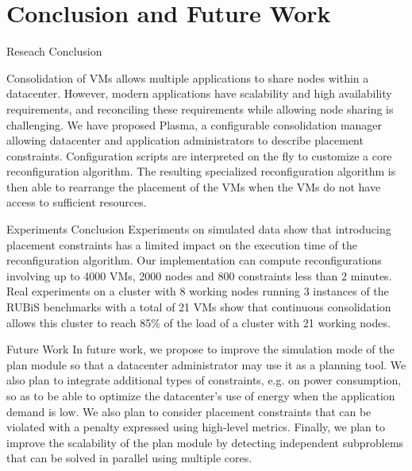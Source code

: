 \section{Conclusion and Future Work} 
\begin{frame}{Reseach Conclusion}

Consolidation of VMs allows multiple applications to share nodes within a 
datacenter. However, modern applications have scalability and high availability
requirements, and reconciling these requirements while allowing node sharing is
challenging. We have proposed Plasma, a configurable consolidation manager
allowing datacenter and application administrators to describe placement 
constraints. Configuration scripts are interpreted on the fly to customize a core
reconfiguration algorithm. The resulting specialized reconfiguration algorithm
is then able to rearrange the placement of the VMs when the VMs do not have
access to sufficient resources.
\end{frame}
\begin{frame}{Experiments Conclusion}
    Experiments on simulated data show that introducing placement constraints
has a limited impact on the execution time of the reconfiguration algorithm. Our
implementation can compute reconfigurations involving up to 4000 VMs, 2000
nodes and 800 constraints less than 2 minutes. Real experiments on a cluster
with 8 working nodes running 3 instances of the RUBiS benchmarks with a total
of 21 VMs show that continuous consolidation allows this cluster to reach 85\%
of the load of a cluster with 21 working nodes.
\end{frame}
\begin{frame}{Future Work}
    In future work, we propose to improve the simulation mode of the plan module
 so that a datacenter administrator may use it as a planning tool. We also
plan to integrate additional types of constraints, e.g. on power consumption, so
as to be able to optimize the datacenter’s use of energy when the application
demand is low. We also plan to consider placement constraints that can be
violated with a penalty expressed using high-level metrics. Finally, we plan to
improve the scalability of the plan module by detecting independent subproblems 
that can be solved in parallel using multiple cores.

\end{frame}

